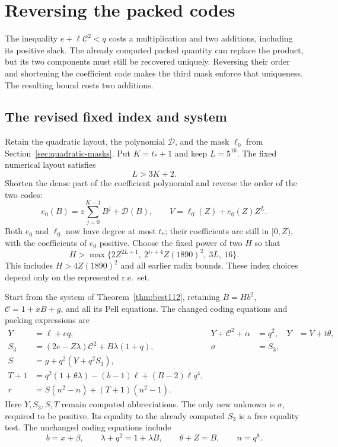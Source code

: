 \section{Reversing the packed codes}\label{sec:reversed-packing}

The inequality $e+\ell\mathcal C^2<q$ costs a multiplication and two
additions, including its positive slack. The already computed packed
quantity can replace the product, but its two components must still be
recovered uniquely. Reversing their order and shortening the coefficient
code makes the third mask enforce that uniqueness. The resulting bound
costs two additions.

\subsection{The revised fixed index and system}

Retain the quadratic layout, the polynomial $\mathcal D$, and the mask
$\ell_0$ from Section~\ref{sec:quadratic-masks}. Put $K=t_*+1$ and keep
$L=5^{16}$. The fixed numerical layout satisfies
\begin{equation}\label{eq:reverse-margin}
 L>3K+2.
\end{equation}
Shorten the dense part of the coefficient polynomial and reverse the
order of the two codes:
\begin{equation}\label{eq:reverse-code}
 e_0(B)=z\sum_{j=0}^{K-1}B^j+\mathcal D(B),\qquad
 V=\ell_0(Z)+e_0(Z)Z^L.
\end{equation}
Both $e_0$ and $\ell_0$ now have degree at most $t_*$; their coefficients
are still in $[0,Z)$, with the coefficients of $e_0$ positive.
Choose the fixed power of two $H$ so that
\begin{equation}\label{eq:reverse-index}
 H>\max\{2Z^{2L+1},\ 2^{t_*+4}Z(1890)^2,\ 3L,\ 16\}.
\end{equation}
This includes $H>4Z(1890)^2$ and all earlier radix bounds. These index
choices depend only on the represented r.e.\ set.

Start from the system of Theorem~\ref{thm:best112}, retaining
$B=Hb^2$, $\mathcal C=1+xB+g$, and all its Pell equations. The changed
coding equations and packing expressions are
\begin{align}
 Y&=\ell+eq,&
 Y+\mathcal C^2+\alpha&=q^2,&
 Y&=V+t\theta,\label{eq:reverse-bound}\\
 S_3&=(2e-Z\lambda)\mathcal C^2+B\lambda(1+q),&
 \sigma&=S_3,\label{eq:reverse-sigma}\\
 S&=g+q^2(Y+q^2S_3),\label{eq:reverse-S}\\
 T+1&=q^2(1+\theta\lambda)-(b-1)\ell
                    +(B-2)\ell q^4,\label{eq:reverse-T}\\
 r&=S(n^2-n)+(T+1)(n^2-1).\label{eq:reverse-r}
\end{align}
Here $Y,S_3,S,T$ remain computed abbreviations. The only new unknown is
$\sigma$, required to be positive. Its equality to the already computed
$S_3$ is a free equality test. The unchanged coding equations include
\[
 b=x+\beta,\qquad \lambda+q^2=1+\lambda B,\qquad
 \theta+Z=B,\qquad n=q^8.
\]

